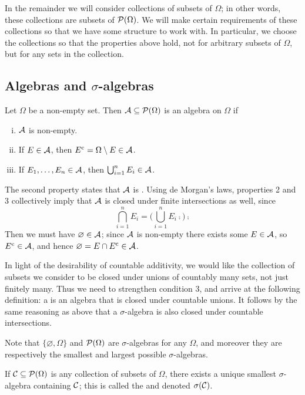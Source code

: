 \documentclass{article}
\begin{document}
In the remainder we will consider collections of subsets of $\Omega$; in other words, these collections are subsets of $\mathcal{P}(\Omega)$.
We will make certain requirements of these collections so that we have some structure to work with.
In particular, we choose the collections so that the properties above hold, not for arbitrary subsets of $\Omega$, but for any sets in the collection.

\subsection{Algebras and $\sigma$-algebras}
Let $\Omega$ be a non-empty set.
Then $\mathcal{A} \subseteq \mathcal{P}(\Omega)$ is an algebra on $\Omega$ if
\begin{enumerate}[(i)]
\item $\mathcal{A}$ is non-empty.
\item If $E \in \mathcal{A}$, then $E^\text{c} = \Omega \setminus E \in \mathcal{A}$.
\item If $E_1, \dots, E_n \in \mathcal{A}$, then $\bigcup_{i=1}^n E_i \in \mathcal{A}$.
\end{enumerate}
The second property states that $\mathcal{A}$ is .
Using de Morgan's laws, properties 2 and 3 collectively imply that $\mathcal{A}$ is closed under finite intersections as well, since
\[\bigcap_{i=1}^n E_i = \bigg(\bigcup_{i=1}^n E_i\comp\bigg)\comp\]
Then we must have $\varnothing \in \mathcal{A}$; since $\mathcal{A}$ is non-empty there exists some $E \in \mathcal{A}$, so $E^\text{c} \in \mathcal{A}$, and hence $\varnothing = E \cap E^\text{c} \in \mathcal{A}$.

In light of the desirability of countable additivity, we would like the collection of subsets we consider to be closed under unions of countably many sets, not just finitely many.
Thus we need to strengthen condition 3, and arrive at the following definition: a  is an algebra that is closed under countable unions.
It follows by the same reasoning as above that a $\sigma$-algebra is also closed under countable intersections.

Note that $\{\varnothing, \Omega\}$ and $\mathcal{P}(\Omega)$ are $\sigma$-algebras for any $\Omega$, and moreover they are respectively the smallest and largest possible $\sigma$-algebras.

If $\mathcal{C} \subseteq \mathcal{P}(\Omega)$ is any collection of subsets of $\Omega$, there exists a unique smallest $\sigma$-algebra containing $\mathcal{C}$; this is called the  and denoted $\sigma(\mathcal{C})$.
\end{document}
